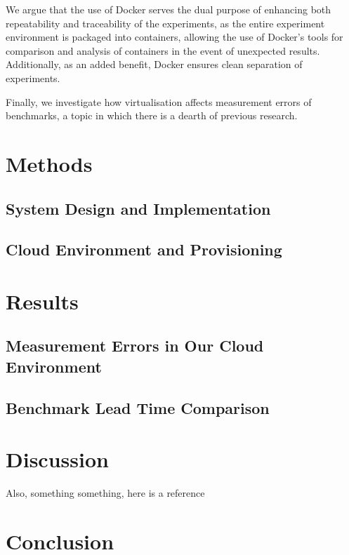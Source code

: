 \documentclass{article}
\begin{document}
\begin{multicols}{2}
We argue that the use of Docker serves the dual purpose of enhancing both
repeatability and traceability of the experiments, as the entire experiment
environment is packaged into containers, allowing the use of Docker's tools for
comparison and analysis of containers in the event of unexpected results.
Additionally, as an added benefit, Docker ensures clean separation of
experiments.

Finally, we investigate how virtualisation affects measurement errors of
benchmarks, a topic in which there is a dearth of previous research.

\section*{Methods}

\fixme{\lipsum[100]}

\subsection*{System Design and Implementation}

\subsection*{Cloud Environment and Provisioning}

\section*{Results}

\subsection*{Measurement Errors in Our Cloud Environment}
\fixme{\lipsum[100]}

\subsection*{Benchmark Lead Time Comparison}
\fixme{\lipsum[100]}

\section*{Discussion}

\fixme{\lipsum[66]}

Also, something something, here is a reference~\cite{mell_nist_nodate}

\section*{Conclusion}

\fixme{\lipsum[100]}

\printbibliography

\end{multicols}
\end{document}
